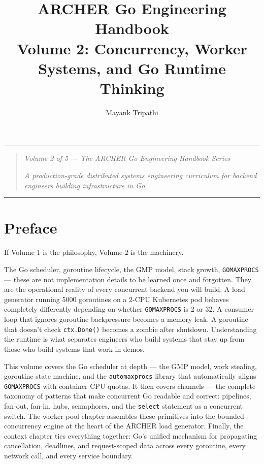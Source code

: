 \documentclass[11pt,a4paper,oneside]{book}
\title{\Huge\bfseries ARCHER Go Engineering Handbook \\ \vspace{0.5em} \Large Volume 2: Concurrency, Worker Systems, and Go Runtime Thinking}
\author{\Large Mayank Tripathi}
\date{}
\begin{document}
\frontmatter
\maketitle
\tableofcontents
\mainmatter




\begin{center}\rule{0.5\linewidth}{0.5pt}\end{center}

\begin{quote}
\emph{Volume 2 of 5 --- The ARCHER Go Engineering Handbook Series}

\emph{A production-grade distributed systems engineering curriculum for
backend engineers building infrastructure in Go.}
\end{quote}

\begin{center}\rule{0.5\linewidth}{0.5pt}\end{center}

\chapter*{Preface}

If Volume 1 is the philosophy, Volume 2 is the machinery.

The Go scheduler, goroutine lifecycle, the GMP model, stack growth,
\texttt{GOMAXPROCS} --- these are not implementation details to be
learned once and forgotten. They are the operational reality of every
concurrent backend you will build. A load generator running 5000
goroutines on a 2-CPU Kubernetes pod behaves completely differently
depending on whether \texttt{GOMAXPROCS} is 2 or 32. A consumer loop
that ignores goroutine backpressure becomes a memory leak. A goroutine
that doesn't check \texttt{ctx.Done()} becomes a zombie after shutdown.
Understanding the runtime is what separates engineers who build systems
that stay up from those who build systems that work in demos.

This volume covers the Go scheduler at depth --- the GMP model, work
stealing, goroutine state machine, and the \texttt{automaxprocs} library
that automatically aligns \texttt{GOMAXPROCS} with container CPU quotas.
It then covers channels --- the complete taxonomy of patterns that make
concurrent Go readable and correct: pipelines, fan-out, fan-in, hubs,
semaphores, and the \texttt{select} statement as a concurrent switch.
The worker pool chapter assembles these primitives into the
bounded-concurrency engine at the heart of the ARCHER load generator.
Finally, the context chapter ties everything together: Go's unified
mechanism for propagating cancellation, deadlines, and request-scoped
data across every goroutine, every network call, and every service
boundary.
\end{document}
